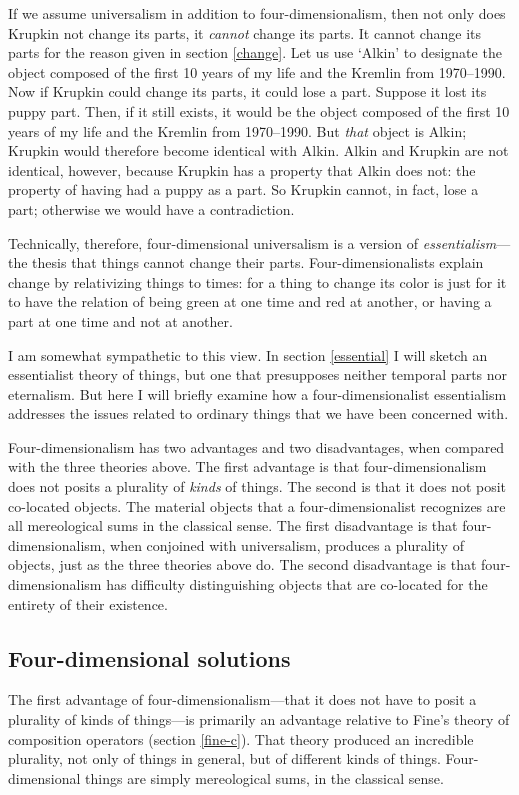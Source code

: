 \documentclass[11pt]{article}
\begin{document}
\begin{spacing}{1.5}
If we assume universalism in addition to four-dimensionalism, then not
only does Krupkin not change its parts, it {\em cannot} change its
parts.  It cannot change its parts for the reason given in section
\ref{change}.  Let us use `Alkin' to designate the object composed of
the first 10 years of my life and the Kremlin from 1970--1990.  Now if
Krupkin could change its parts, it could lose a part.  Suppose it lost
its puppy part.  Then, if it still exists, it would be the object
composed of the first 10 years of my life and the Kremlin from
1970--1990.  But {\em that} object is Alkin; Krupkin would therefore
become identical with Alkin.  Alkin and Krupkin are not identical,
however, because Krupkin has a property that Alkin does not: the
property of having had a puppy as a part.  So Krupkin cannot, in fact,
lose a part; otherwise we would have a contradiction.

Technically, therefore, four-dimensional universalism is a version of
{\em essentialism}---the thesis that things cannot change their parts.
Four-dimensionalists explain change by relativizing things to times:
for a thing to change its color is just for it to have the relation of
being green at one time and red at another, or having a part at one
time and not at another.

I am somewhat sympathetic to this view.  In section \ref{essential} I
will sketch an essentialist theory of things, but one that presupposes
neither temporal parts nor eternalism.  But here I will briefly
examine how a four-dimensionalist essentialism addresses the issues
related to ordinary things that we have been concerned with.

Four-dimensionalism has two advantages and two disadvantages, when
compared with the three theories above.  The first advantage is that
four-dimensionalism does not posits a plurality of {\em kinds} of
things.  The second is that it does not posit co-located objects.  The
material objects that a four-dimensionalist recognizes are all
mereological sums in the classical sense.  The first disadvantage is
that four-dimensionalism, when conjoined with universalism, produces a
plurality of objects, just as the three theories above do.  The second
disadvantage is that four-dimensionalism has difficulty distinguishing
objects that are co-located for the entirety of their existence.

\subsection{Four-dimensional solutions}
\label{4ds}
The first advantage of four-dimensionalism---that it does not have to posit
a plurality of kinds of things---is primarily an advantage relative to
Fine's theory of composition operators (section \ref{fine-c}).  That
theory produced an incredible plurality, not only of things in
general, but of different kinds of things.  Four-dimensional things
are simply mereological sums, in the classical sense.


\end{spacing}
\end{document}
